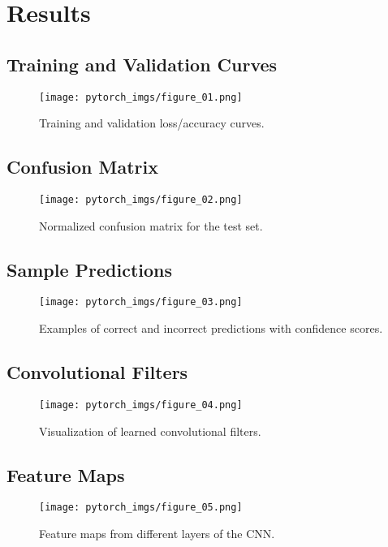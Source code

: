 \documentclass[12pt,a4paper]{article}
\begin{document}
\section{Results}
\subsection{Training and Validation Curves}
\begin{figure}[H]
    \centering
    \texttt{[image: pytorch\_imgs/figure\_01.png]}
    \caption{Training and validation loss/accuracy curves.}
\end{figure}

\subsection{Confusion Matrix}
\begin{figure}[H]
    \centering
    \texttt{[image: pytorch\_imgs/figure\_02.png]}
    \caption{Normalized confusion matrix for the test set.}
\end{figure}

\subsection{Sample Predictions}
\begin{figure}[H]
    \centering
    \texttt{[image: pytorch\_imgs/figure\_03.png]}
    \caption{Examples of correct and incorrect predictions with confidence scores.}
\end{figure}

\subsection{Convolutional Filters}
\begin{figure}[H]
    \centering
    \texttt{[image: pytorch\_imgs/figure\_04.png]}
    \caption{Visualization of learned convolutional filters.}
\end{figure}

\subsection{Feature Maps}
\begin{figure}[H]
    \centering
    \texttt{[image: pytorch\_imgs/figure\_05.png]}
    \caption{Feature maps from different layers of the CNN.}
\end{figure}
\end{document}
